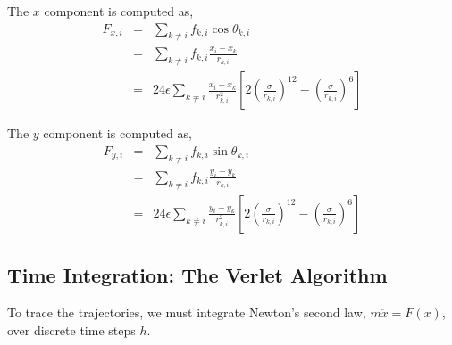 \documentclass[12pt, a4paper, oneside]{article}
\begin{document}
        The $x$ component is computed as,
        \begin{eqnarray}
            \label{eq3: Force along x direction}
            F_{x,i} & = & \sum_{k\neq i} f_{k,i} \cos{\theta_{k,i}} \\ \nonumber
            & = & \sum_{k\neq i} f_{k,i} \frac{x_i - x_k}{r_{k,i}} \\ \nonumber
            & = & 24 \epsilon \sum_{k\neq i} \frac{x_i - x_k}{r_{k,i}^2} \left[ 2\left(\frac{\sigma}{r_{k,i}}\right)^{12} - \left(\frac{\sigma}{r_{k,i}}\right)^{6}\right]
        \end{eqnarray}
        
        The $y$ component is computed as,
        \begin{eqnarray}
            \label{eq4: Force along y direction}
            F_{y,i} & = & \sum_{k\neq i} f_{k,i} \sin{\theta_{k,i}} \\ \nonumber
            & = & \sum_{k\neq i} f_{k,i} \frac{y_i - y_k}{r_{k,i}} \\ \nonumber
            & = & 24 \epsilon \sum_{k\neq i} \frac{y_i - y_k}{r_{k,i}^2} \left[ 2\left(\frac{\sigma}{r_{k,i}}\right)^{12} - \left(\frac{\sigma}{r_{k,i}}\right)^{6}\right]
        \end{eqnarray}

        \subsection{Time Integration: The Verlet Algorithm}
            To trace the trajectories, we must integrate Newton's second law, $m \ddot{x} = F(x)$, over discrete time steps $h$.
\end{document}

